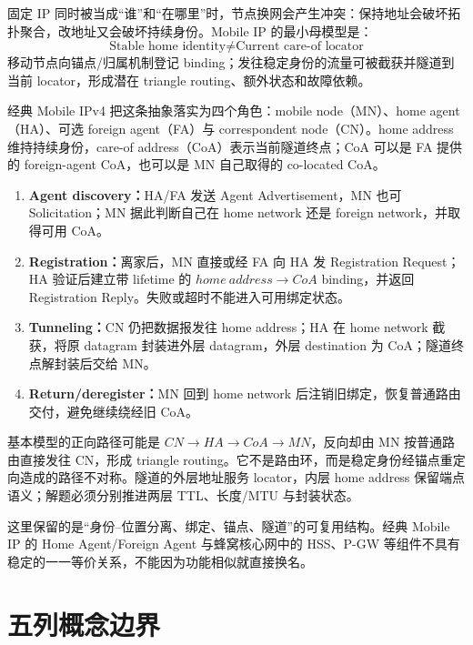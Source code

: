 \documentclass[11pt,a4paper]{ctexart}
\newcommand{\kw}[1]{\textbf{\color{deep}#1}}
\begin{document}
固定 IP 同时被当成“谁”和“在哪里”时，节点换网会产生冲突：保持地址会破坏拓扑聚合，改地址又会破坏持续身份。Mobile IP 的最小母模型是：
\[
\boxed{\text{Stable home identity}\ne\text{Current care-of locator}}
\]
移动节点向锚点/归属机制登记 binding；发往稳定身份的流量可被截获并隧道到当前 locator，形成潜在 triangle routing、额外状态和故障依赖。

经典 Mobile IPv4 把这条抽象落实为四个角色：mobile node（MN）、home agent（HA）、可选 foreign agent（FA）与 correspondent node（CN）。home address 维持持续身份，care-of address（CoA）表示当前隧道终点；CoA 可以是 FA 提供的 foreign-agent CoA，也可以是 MN 自己取得的 co-located CoA。

\begin{enumerate}
  \item \kw{Agent discovery：}HA/FA 发送 Agent Advertisement，MN 也可 Solicitation；MN 据此判断自己在 home network 还是 foreign network，并取得可用 CoA。
  \item \kw{Registration：}离家后，MN 直接或经 FA 向 HA 发 Registration Request；HA 验证后建立带 lifetime 的 $home\ address\to CoA$ binding，并返回 Registration Reply。失败或超时不能进入可用绑定状态。
  \item \kw{Tunneling：}CN 仍把数据报发往 home address；HA 在 home network 截获，将原 datagram 封装进外层 datagram，外层 destination 为 CoA；隧道终点解封装后交给 MN。
  \item \kw{Return/deregister：}MN 回到 home network 后注销旧绑定，恢复普通路由交付，避免继续绕经旧 CoA。
\end{enumerate}

基本模型的正向路径可能是 $CN\to HA\to CoA\to MN$，反向却由 MN 按普通路由直接发往 CN，形成 triangle routing。它不是路由环，而是稳定身份经锚点重定向造成的路径不对称。隧道的外层地址服务 locator，内层 home address 保留端点语义；解题必须分别推进两层 TTL、长度/MTU 与封装状态。

这里保留的是“身份--位置分离、绑定、锚点、隧道”的可复用结构。经典 Mobile IP 的 Home Agent/Foreign Agent 与蜂窝核心网中的 HSS、P-GW 等组件不具有稳定的一一等价关系，不能因为功能相似就直接换名。

\section{五列概念边界}
\end{document}
